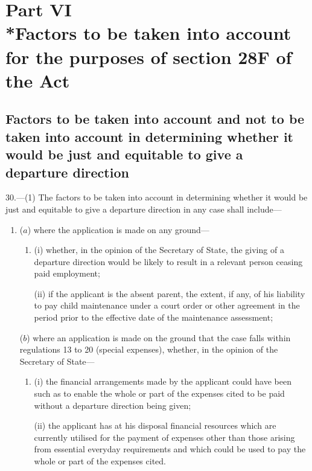 \documentclass[a4paper]{article}
\newcommand{\parthead}{}
\begin{document}
\section[Part VI --- Factors to be taken into account for the purposes of section 28F of the Act]{Part VI\\*Factors to be taken into account for the purposes of section 28F of the Act}

\renewcommand\parthead{--- Part VI}

\subsection[30. Factors to be taken into account and not to be taken into account in
determining whether it would be just and equitable to give a departure
direction]{Factors to be taken into account and not to be taken into account in
determining whether it would be just and equitable to give a departure
direction}

30.—(1) The factors to be taken into account in determining whether it
would be just and equitable to give a departure direction in any case shall
include—
\begin{enumerate}\item[]
($a$) where the application is made on any ground—
\begin{enumerate}\item[]
(i) whether, in the opinion of the Secretary of State, the giving of a departure
direction would be likely to result in a relevant person ceasing paid
employment;

(ii) if the applicant is the absent parent, the extent, if any, of his liability
to pay child maintenance under a court order or other agreement in the period
prior to the effective date of the maintenance assessment;
\end{enumerate}

($b$) where an application is made on the ground that the case falls within
regulations 13 to 20 (special expenses), whether, in the opinion of the
Secretary of State—
\begin{enumerate}\item[]
(i) the financial arrangements made by the applicant could have been such as to
enable the whole or part of the expenses cited to be paid without a departure
direction being given;

(ii) the applicant has at his disposal financial resources which are currently
utilised for the payment of expenses other than those arising from essential
everyday requirements and which could be used to pay the whole or part of the
expenses cited.
\end{enumerate}
\end{enumerate}
\end{document}
